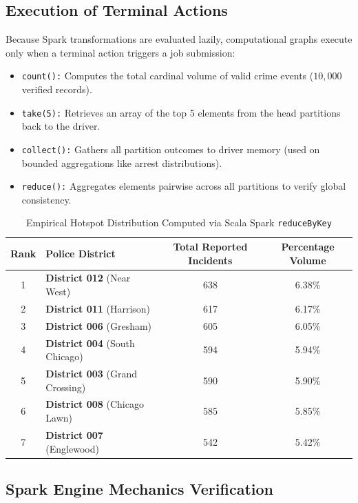 \documentclass[11pt,a4paper]{article}
\begin{document}
\subsection{Execution of Terminal Actions}
Because Spark transformations are evaluated lazily, computational graphs execute only when a terminal action triggers a job submission:
\begin{itemize}[leftmargin=*]
    \item \texttt{count():} Computes the total cardinal volume of valid crime events ($10,000$ verified records).
    \item \texttt{take(5):} Retrieves an array of the top 5 elements from the head partitions back to the driver.
    \item \texttt{collect():} Gathers all partition outcomes to driver memory (used on bounded aggregations like arrest distributions).
    \item \texttt{reduce():} Aggregates elements pairwise across all partitions to verify global consistency.
\end{itemize}

\begin{table}[H]
    \centering
    \small
    \renewcommand{\arraystretch}{1.2}
    \caption{Empirical Hotspot Distribution Computed via Scala Spark \texttt{reduceByKey}}
    \label{tab:district_counts}
    \begin{tabular}{clcc}
        \toprule
        \textbf{Rank} & \textbf{Police District} & \textbf{Total Reported Incidents} & \textbf{Percentage Volume} \\
        \midrule
        1 & \textbf{District 012} (Near West) & 638 & 6.38\% \\
        2 & \textbf{District 011} (Harrison) & 617 & 6.17\% \\
        3 & \textbf{District 006} (Gresham) & 605 & 6.05\% \\
        4 & \textbf{District 004} (South Chicago) & 594 & 5.94\% \\
        5 & \textbf{District 003} (Grand Crossing) & 590 & 5.90\% \\
        6 & \textbf{District 008} (Chicago Lawn) & 585 & 5.85\% \\
        7 & \textbf{District 007} (Englewood) & 542 & 5.42\% \\
        \bottomrule
    \end{tabular}
\end{table}

\subsection{Spark Engine Mechanics Verification}
\end{document}
